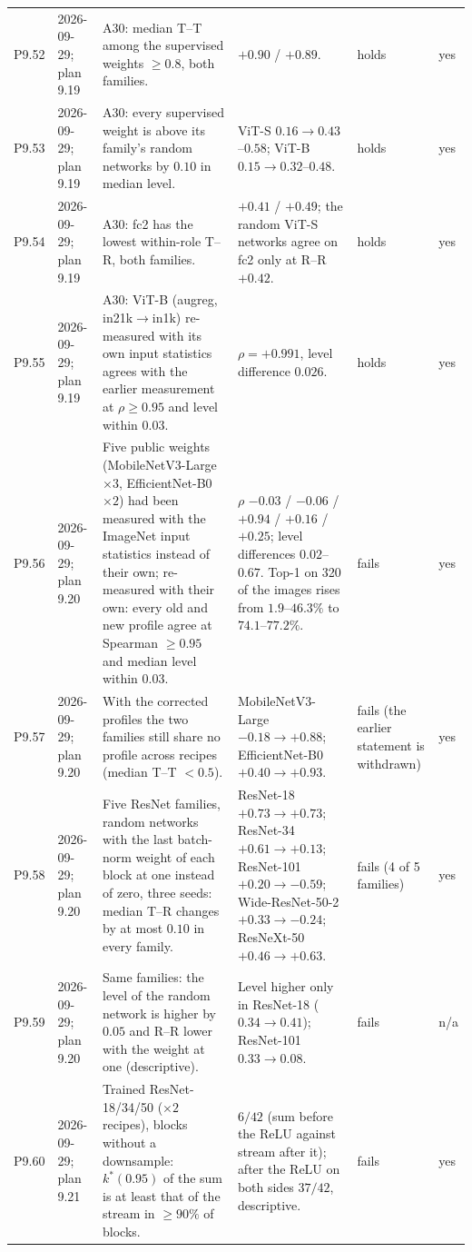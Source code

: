 \begin{longtable}{p{1.1cm}p{1.4cm}p{6.2cm}p{4.6cm}p{2.0cm}p{1.6cm}}
P9.52 & 2026-09-29; plan 9.19 & A30: median T--T among the supervised weights $\ge 0.8$, both families. & $+0.90$ / $+0.89$. & holds & yes \\
P9.53 & 2026-09-29; plan 9.19 & A30: every supervised weight is above its family's random networks by $0.10$ in median level. & ViT-S $0.16 \to 0.43$--$0.58$; ViT-B $0.15 \to 0.32$--$0.48$. & holds & yes \\
P9.54 & 2026-09-29; plan 9.19 & A30: fc2 has the lowest within-role T--R, both families. & $+0.41$ / $+0.49$; the random ViT-S networks agree on fc2 only at R--R $+0.42$. & holds & yes \\
P9.55 & 2026-09-29; plan 9.19 & A30: ViT-B (augreg, in21k$\to$in1k) re-measured with its own input statistics agrees with the earlier measurement at $\rho \ge 0.95$ and level within $0.03$. & $\rho = +0.991$, level difference $0.026$. & holds & yes \\
P9.56 & 2026-09-29; plan 9.20 & Five public weights (MobileNetV3-Large $\times 3$, EfficientNet-B0 $\times 2$) had been measured with the ImageNet input statistics instead of their own; re-measured with their own: every old and new profile agree at Spearman $\ge 0.95$ and median level within $0.03$. & $\rho$ $-0.03$ / $-0.06$ / $+0.94$ / $+0.16$ / $+0.25$; level differences $0.02$--$0.67$. Top-1 on 320 of the images rises from $1.9$--$46.3\%$ to $74.1$--$77.2\%$. & fails & yes \\
P9.57 & 2026-09-29; plan 9.20 & With the corrected profiles the two families still share no profile across recipes (median T--T $< 0.5$). & MobileNetV3-Large $-0.18 \to +0.88$; EfficientNet-B0 $+0.40 \to +0.93$. & fails (the earlier statement is withdrawn) & yes \\
P9.58 & 2026-09-29; plan 9.20 & Five ResNet families, random networks with the last batch-norm weight of each block at one instead of zero, three seeds: median T--R changes by at most $0.10$ in every family. & ResNet-18 $+0.73 \to +0.73$; ResNet-34 $+0.61 \to +0.13$; ResNet-101 $+0.20 \to -0.59$; Wide-ResNet-50-2 $+0.33 \to -0.24$; ResNeXt-50 $+0.46 \to +0.63$. & fails (4 of 5 families) & yes \\
P9.59 & 2026-09-29; plan 9.20 & Same families: the level of the random network is higher by $0.05$ and R--R lower with the weight at one (descriptive). & Level higher only in ResNet-18 ($0.34 \to 0.41$); ResNet-101 $0.33 \to 0.08$. & fails & n/a \\
P9.60 & 2026-09-29; plan 9.21 & Trained ResNet-18/34/50 ($\times 2$ recipes), blocks without a downsample: $k^*(0.95)$ of the sum is at least that of the stream in $\ge 90\%$ of blocks. & $6/42$ (sum before the ReLU against stream after it); after the ReLU on both sides $37/42$, descriptive. & fails & yes \\

\end{longtable}
